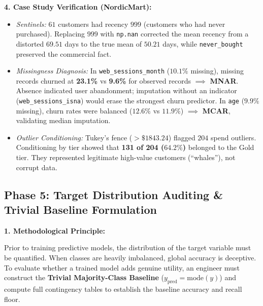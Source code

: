 \documentclass[11pt,a4paper]{article}
\begin{document}
\vspace{0.4em}
\noindent\textbf{4. Case Study Verification (NordicMart):}\par\vspace{0.2em}
\begin{itemize}[leftmargin=*]
    \item \textit{Sentinels:} $61$ customers had recency $999$ (customers who had never purchased). Replacing $999$ with \lstinline!np.nan! corrected the mean recency from a distorted $69.51$ days to the true mean of $50.21$ days, while \lstinline!never_bought! preserved the commercial fact.
    \item \textit{Missingness Diagnosis:} In \lstinline!web_sessions_month! ($10.1\%$ missing), missing records churned at \textbf{23.1\%} vs \textbf{9.6\%} for observed records $\implies$ \textbf{MNAR}. Absence indicated user abandonment; imputation without an indicator (\lstinline!web_sessions_isna!) would erase the strongest churn predictor. In \lstinline!age! ($9.9\%$ missing), churn rates were balanced ($12.6\%$ vs $11.9\%$) $\implies$ \textbf{MCAR}, validating median imputation.
    \item \textit{Outlier Conditioning:} Tukey's fence ($> \$1843.24$) flagged $204$ spend outliers. Conditioning by tier showed that \textbf{131 of 204 ($64.2\%$)} belonged to the Gold tier. They represented legitimate high-value customers (``whales''), not corrupt data.
\end{itemize}

\subsection*{Phase 5: Target Distribution Auditing \& Trivial Baseline Formulation}

\noindent\textbf{1. Methodological Principle:}\par\vspace{0.2em}
Prior to training predictive models, the distribution of the target variable must be quantified. When classes are heavily imbalanced, global accuracy is deceptive. To evaluate whether a trained model adds genuine utility, an engineer must construct the \textbf{Trivial Majority-Class Baseline} ($y_{\text{pred}} = \text{mode}(y)$) and compute full contingency tables to establish the baseline accuracy and recall floor.
\end{document}
